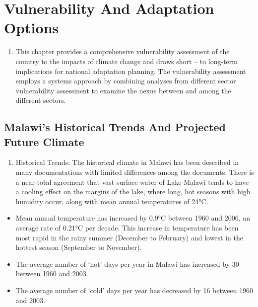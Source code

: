 \documentclass[
]{book}
\providecommand{\tightlist}{%
  \setlength{\itemsep}{0pt}\setlength{\parskip}{0pt}}
\begin{document}
\hypertarget{vulnerability-and-adaptation-options}{%
\chapter{Vulnerability And Adaptation Options}\label{vulnerability-and-adaptation-options}}

\begin{enumerate}
\def\labelenumi{\arabic{enumi}.}
\setcounter{enumi}{48}
\tightlist
\item
  This chapter provides a comprehensive vulnerability assessment of the country to the impacts of climate change and draws short -- to long-term implications for national adaptation planning. The vulnerability assessment employs a systems approach by combining analyses from different sector vulnerability assessment to examine the nexus between and among the different sectors.
\end{enumerate}

\hypertarget{malawis-historical-trends-and-projected-future-climate}{%
\section{Malawi's Historical Trends And Projected Future Climate}\label{malawis-historical-trends-and-projected-future-climate}}

\begin{enumerate}
\def\labelenumi{\arabic{enumi}.}
\setcounter{enumi}{49}
\tightlist
\item
  Historical Trends: The historical climate in Malawi has been described in many documentations with limited differences among the documents. There is a near-total agreement that vast surface water of Lake Malawi tends to have a cooling effect on the margins of the lake, where long, hot seasons with high humidity occur, along with mean annual temperatures of 24°C.
\end{enumerate}

\begin{itemize}
\tightlist
\item
  Mean annual temperature has increased by 0.9°C between 1960 and 2006, an average rate of 0.21°C per decade. This increase in temperature has been most rapid in the rainy summer (December to February) and lowest in the hottest season (September to November).
\item
  The average number of `hot' days per year in Malawi has increased by 30 between 1960 and 2003.
\item
  The average number of `cold' days per year has decreased by 16 between 1960 and 2003.
\end{itemize}
\end{document}
